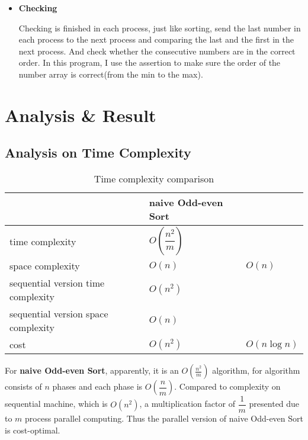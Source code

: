 \documentclass{article}
\begin{document}
\begin{itemize}
\begin{itemize}
				\end{itemize}

		\item
			{\bf Checking}

			Checking is finished in each process, just like
			sorting, send the last number in each process to
			the next process and comparing the last and the
			first in the next process. And check whether the
			consecutive numbers are in the correct order. In
			this program, I use the assertion to make sure
			the order of the number array is correct(from the
			min to the max).
	\end{itemize}

\section{Analysis \& Result}
	\subsection{Analysis on Time Complexity}
	\label{sec:time-complexity}
	\begin{table}[h]
		\centering
		\begin{tabular}{>{\centering\arraybackslash}p{1.2in}|>{\centering\arraybackslash}p{1.5in}}
			& {\bf naive Odd-even Sort} \\\hline
			time complexity &  {$O(\dfrac{n^2}{m})$} \\\hline
			space complexity &  $O(n)$ &  $O(n)$ \\\hline
			{sequential version time complexity} &  $O(n^2)$ \\\hline
			{sequential version space complexity} &  $O(n)$ \\\hline
			cost & $O(n^2)$ & $O(n \log{n})$
		\end{tabular}
		\caption{Time complexity comparison}
	\end{table}


	For {\bf naive Odd-even Sort}, apparently, it is an $O(\frac{n^2}{m})$
	algorithm, for algorithm consists of $n$ phases and each phase is
	$O(\dfrac{n}{m})$. Compared to complexity on sequential machine, which
	is $O(n^2)$, a multiplication factor of $\dfrac{1}{m}$ presented due to
	$m$ process parallel computing. Thus the parallel version of naive
	Odd-even Sort is cost-optimal.
\end{document}
